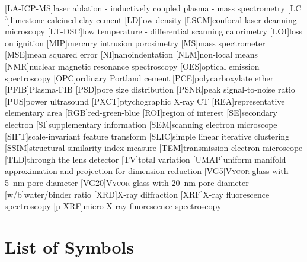 \begin{acronym}[LA-ICP-MS]
	[LA-ICP-MS]{laser ablation - inductively coupled plasma - mass spectrometry}
	[LC$^3$]{limestone calcined clay cement} %
	[LD]{low-density}
	[LSCM]{confocal laser dcanning microscopy}
	[LT-DSC]{low temperature - differential scanning calorimetry}
	[LOI]{loss on ignition}
	[MIP]{mercury intrusion porosimetry}
	[MS]{mass spectrometer}
	[MSE]{mean squared error}
	[NI]{nanoindentation}
	[NLM]{non-local means}
	[NMR]{nuclear magnetic resonance spectroscopy}
	[OES]{optical emission spectroscopy}
	[OPC]{ordinary Portland cement}
	[PCE]{polycarboxylate ether}
	[PFIB]{Plasma-FIB}
	[PSD]{pore size distribution}
	[PSNR]{peak signal-to-noise ratio}
	[PUS]{power ultrasound}
	[PXCT]{ptychographic X-ray CT}
	[REA]{representative elementary area}
	[RGB]{red-green-blue}
	[ROI]{region of interest}
	[SE]{secondary electron}
	[SI]{supplementary information}
	[SEM]{scanning electron microscope}
	[SIFT]{scale-invariant feature transform}
	[SLIC]{simple linear iterative clustering}
	[SSIM]{structural similarity index measure}
	[TEM]{transmission electron microscope}
	[TLD]{through the lens detector}
	[TV]{total variation}
	[UMAP]{uniform manifold approximation and projection for dimension reduction}
	[VG5]{V\textsc{ycor} glass with \qty{5}{\nano\meter} pore diameter}
	[VG20]{V\textsc{ycor} glass with \qty{20}{\nano\meter} pore diameter}
	[w/b]{water/binder ratio} %
	[XRD]{X-ray diffraction}
	[XRF]{X-ray fluorescence spectroscopy}
	[µ-XRF]{micro X-ray fluorescence spectroscopy}
\end{acronym}


\chapter{List of Symbols}


